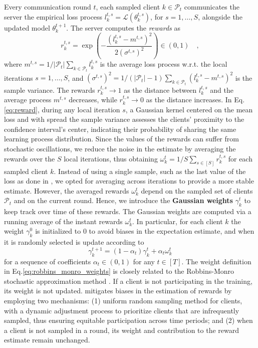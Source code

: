 Every communication round $t$, each sampled client $k \in \mathcal{P}_t$ communicates the server the empirical loss process $l_k^{t,s} = \mathcal{L}(\theta_k^{t,s})$, for $s = 1,\dots,S$, alongside the updated model $\theta_k^{t+1}$. The server computes the \textit{rewards} as
\begin{equation}\label{eq:reward}
r_k^{t,s} = \exp{\left(- \dfrac{(l_k^{t,s} - m^{t,s})^2}{2(\sigma^{t,s})^2}\right)} \in (0,1)\quad,
\end{equation}
where $m^{t, s} = 1/|\mathcal{P}_t| \sum_{k \in \mathcal{P}_t} l_k^{t,s}$ is the average loss process w.r.t. the local iterations $s = 1,\dots, S$, and $({\sigma}^{t,s})^2 = 1/(|\mathcal{P}_t|-1) \sum_{k \in \mathcal{P}_t} (l_k^{t,s} - m^{t, s})^2 $ is the sample variance. The rewards $r_k^{t,s} \to 1$ as the distance between $l_k^{t,s}$ and the average process $m^{t, s}$ decreases, while $r_k^{t,s} \to 0$ as the distance increases.
In Eq. \ref{eq:reward}, during any local iteration $s$, a Gaussian kernel centered on the mean loss and with spread the sample variance assesses the clients' proximity to the confidence interval's center, indicating their probability of sharing the same learning process distribution. Since the values of the rewards can suffer from stochastic oscillations, we reduce the noise in the estimate by averaging the rewards over the  $S$ local iterations, thus obtaining $\omega_k^t = 1/S \sum_{s \in [S]} r_k^{t,s}$ for each sampled client $k$. Instead of using a single sample, such as the last value of the loss as done in \cite{cho2022towards}, we opted for averaging across iterations to provide a more stable estimate. However, the averaged rewards $\omega_k^t$ depend on the sampled set of clients $\mathcal{P}_t$ and on the current round. Hence, we introduce the \textbf{Gaussian weights} $\gamma_k^t$  to keep track over time of these rewards. The Gaussian weights are computed via a running average of the instant rewards $\omega_k^t$. In particular, for each client $k$ the weight $\gamma_k^0$ is initialized to $0$ to avoid biases in the expectation estimate, and when it is randomly selected is update according to
\begin{equation}\label{eq:robbins_monro_weights}
    \gamma_k^{t+1} = (1-\alpha_t) \gamma_k^t + \alpha_t \omega_k^t
\end{equation}
for a sequence of coefficients $\alpha_t \in (0,1)$ for any $t \in [T]$. The weight definition in Eq.\ref{eq:robbins_monro_weights} is closely related to the Robbins-Monro stochastic approximation method \citep{robbins1951stochastic}. If a client is not participating in the training, its weight is not updated.
\shortname mitigates biases in the estimation of rewards by employing two mechanisms: (1) uniform random sampling method for clients, with a dynamic adjustment process to prioritize clients that are infrequently sampled, thus ensuring equitable participation across time periods; and (2) when a client is not sampled in a round, its weight and contribution to the reward estimate remain unchanged.\vspace{-1em}

